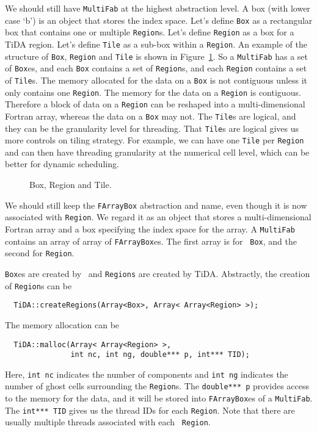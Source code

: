 We should still have {\tt MultiFab} at the highest abstraction level.
A box (with lower case `b') is an object that stores the index space.
Let's define {\tt Box} as a rectangular box that contains one or
multiple {\tt Region}s.  Let's define {\tt Region} as a box for a TiDA
region.  Let's define {\tt Tile} as a sub-box within a {\tt Region}.
An example of the structure of {\tt Box}, {\tt Region} and {\tt Tile}
is shown in Figure~\ref{fig:BRT}.  So a {\tt MultiFab} has a set of
{\tt Box}es, and each {\tt Box} contains a set of {\tt Region}s, and
each {\tt Region} contains a set of {\tt Tile}s.  The memory allocated
for the data on a {\tt Box} is not contiguous unless it only contains
one {\tt Region}.  The memory for the data on a {\tt Region} is
contiguous.  Therefore a block of data on a {\tt Region} can be
reshaped into a multi-dimensional Fortran array, whereas the data on a
{\tt Box} may not.  The {\tt Tile}s are logical, and they can be the
granularity level for threading.  That {\tt Tile}s are logical gives
us more controls on tiling strategy.  For example, we can have one
{\tt Tile} per {\tt Region} and can then have threading granularity at
the numerical cell level, which can be better for dynamic scheduling.

\begin{figure}
\centering
\caption{\label{fig:BRT} Box, Region and Tile.}
\end{figure}

We should still keep the {\tt FArrayBox} abstraction and name, even
though it is now associated with {\tt Region}.  We regard it as an
object that stores a multi-dimensional Fortran array and a box
specifying the index space for the array.  A {\tt MultiFab} contains
an array of array of {\tt FArrayBox}es.  The first array is for {\tt
  Box}, and the second for {\tt Region}.

{\tt Box}es are created by \boxlib\ and {\tt Regions} are created by
TiDA.  Abstractly, the creation of {\tt Region}s can be 
\begin{lstlisting}
  TiDA::createRegions(Array<Box>, Array< Array<Region> >);
\end{lstlisting}
The memory allocation can be
\begin{lstlisting}
  TiDA::malloc(Array< Array<Region> >, 
               int nc, int ng, double*** p, int*** TID);
\end{lstlisting}
Here, {\tt int nc} indicates the number of components and {\tt int ng}
indicates the number of ghost cells surrounding the {\tt Region}s.
The {\tt double*** p} provides access to the memory for the data, and
it will be stored into {\tt FArrayBox}es of a {\tt MultiFab}.  The
{\tt int*** TID} gives us the thread IDs for each {\tt Region}.  Note
that there are usually multiple threads associated with each {\tt
  Region}. 

